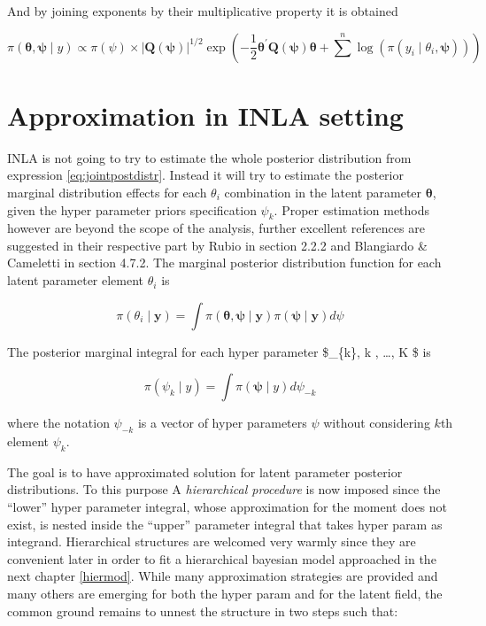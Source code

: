 \documentclass[
  12pt,
  a4paper,
  oneside]{book}
\theoremstyle{definition}
\theoremstyle{definition}
\theoremstyle{definition}
\theoremstyle{remark}
\begin{document}
And by joining exponents by their multiplicative property it is obtained

\begin{equation}
\pi(\boldsymbol{\theta}, \boldsymbol{\psi} \mid y) \propto \pi(\psi) \times|\boldsymbol{Q}(\boldsymbol{\psi})|^{1 / 2} \exp \left(-\frac{1}{2} \boldsymbol{\theta}^{\prime} \boldsymbol{Q}(\boldsymbol{\psi}) \boldsymbol{\theta}+\sum^{n} \log \left(\pi\left(y_{i} \mid \theta_{i}, \boldsymbol{\psi}\right)\right)\right)
\label{eq:jointpostdistr}
\end{equation}

\hypertarget{approx}{%
\section{Approximation in INLA setting}\label{approx}}

INLA is not going to try to estimate the whole posterior distribution from expression \eqref{eq:jointpostdistr}. Instead it will try to estimate the posterior marginal distribution effects for each \(\theta_{i}\) combination in the latent parameter \(\boldsymbol{\theta}\), given the hyper parameter priors specification \(\psi_{k}\). Proper estimation methods however are beyond the scope of the analysis, further excellent references are suggested in their respective part by Rubio \citeyearpar{Bayesian_INLA_Rubio} in section 2.2.2 and Blangiardo \& Cameletti \citeyearpar{Blangiardo-Cameletti} in section 4.7.2.
The marginal posterior distribution function for each latent parameter element \(\theta_{i}\) is

\begin{equation}
  \pi(\theta_{i} \mid \boldsymbol{y})=\int \pi(\boldsymbol{\theta}, \boldsymbol{\psi} \mid \mathbf{y}) \pi(\boldsymbol{\psi} \mid \mathbf{y}) d \psi
\label{eq:latentparam}
\end{equation}

The posterior marginal integral for each hyper parameter \$\psi\_\{k\}, \forall k , \ldots, K \$ is

\[
\pi\left(\psi_{k} \mid y\right)=\int \pi(\boldsymbol{\psi} \mid y) d \psi_{-k}
\]

where the notation \(\psi_{-k}\) is a vector of hyper parameters \(\psi\) without considering \(k\)th element \(\psi_{k}\).

The goal is to have approximated solution for latent parameter posterior distributions. To this purpose A \emph{hierarchical procedure} is now imposed since the ``lower'' hyper parameter integral, whose approximation for the moment does not exist, is nested inside the ``upper'' parameter integral that takes hyper param as integrand. Hierarchical structures are welcomed very warmly since they are convenient later in order to fit a hierarchical bayesian model approached in the next chapter \ref{hiermod}. While many approximation strategies are provided and many others are emerging for both the hyper param and for the latent field, the common ground remains to unnest the structure in two steps such that:
\end{document}
